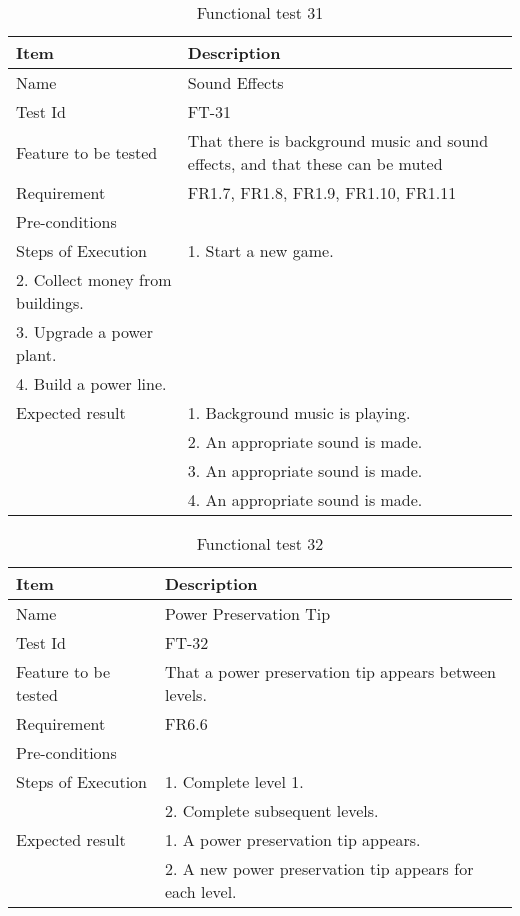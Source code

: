 \begin{table}[H]
\centering
	\begin{tabular}{ l | p{8cm} }
		\hline
		{\bf Item} & {\bf Description} \\ \hline
		Name & Sound Effects \\ 
		Test Id & FT-31 \\ 
		Feature to be tested & That there is background music and sound effects, and that these can be muted \\ 
		Requirement & FR1.7, FR1.8, FR1.9, FR1.10, FR1.11 \\ 
		Pre-conditions & \\ 
		Steps of Execution & 1. Start a new game. \\
		2. Collect money from buildings. \\
		3. Upgrade a power plant. \\
		4. Build a power line. \\
		Expected result & 1. Background music is playing. \\
		& 2. An appropriate sound is made. \\
		& 3. An appropriate sound is made. \\
		& 4. An appropriate sound is made. \\
	\end{tabular}
	\caption{Functional test 31}
\end{table}

\begin{table}[H]
\centering
	\begin{tabular}{ l | p{8cm} }
		\hline
		{\bf Item} & {\bf Description} \\ \hline
		Name & Power Preservation Tip \\ 
		Test Id & FT-32 \\ 
		Feature to be tested & That a power preservation tip appears between levels. \\ 
		Requirement & FR6.6 \\ 
		Pre-conditions & \\ 
		Steps of Execution & 1. Complete level 1. \\
		& 2. Complete subsequent levels. \\
		Expected result & 1. A power preservation tip appears. \\
		& 2. A new power preservation tip appears for each level. \\
	\end{tabular}
	\caption{Functional test 32}
\end{table}

